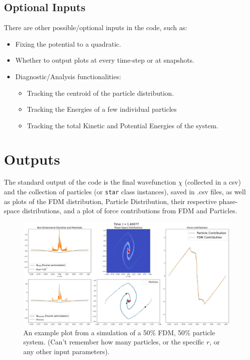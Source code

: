 \documentclass[oneside]{book}
\begin{document}
\subsection{Optional Inputs}
There are other possible/optional inputs in the code, such as: 
\begin{itemize}
    \item Fixing the potential to a quadratic.
    \item Whether to output plots at every time-step or at snapshots.
    \item Diagnostic/Analysis functionalities: 
    \begin{itemize}
        \item Tracking the centroid of the particle distribution.
        \item Tracking the Energies of a few individual particles
        \item Tracking the total Kinetic and Potential Energies of the system.
    \end{itemize}
\end{itemize}

\section{Outputs}
The standard output of the code is the final wavefunction $\chi$ (collected in a csv) and the collection of particles 
(or \texttt{star} class instances), saved in .csv files, as well as plots of the FDM distribution, Particle Distribution, 
their respective phase-space distributions, and a plot of force contributions from FDM and Particles. 

\begin{figure}[h]
    \centering
    \includegraphics[width=\textwidth]{Images/ToyModelPlot0100.jpg}
    \caption{An example plot from a simulation of a 50\% FDM, 50\% particle system. (Can't remember how many particles, or the specific $r$, or any other input parameters). }
    \label{Example Snapshot}
\end{figure}
\end{document}
